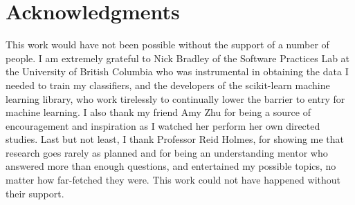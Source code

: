 \documentclass[sigchi]{acmart}
\begin{document}
\section{Acknowledgments}
This work would have not been possible without the support of a number of people. I am extremely grateful to Nick Bradley of the Software Practices Lab at the University of British Columbia who was instrumental in obtaining the data I needed to train my classifiers, and the developers of the scikit-learn machine learning library, who work tirelessly to continually lower the barrier to entry for machine learning. I also thank my friend Amy Zhu for being a source of encouragement and inspiration as I watched her perform her own directed studies. Last but not least, I thank Professor Reid Holmes, for showing me that research goes rarely as planned and for being an understanding mentor who answered more than enough questions, and entertained my possible topics, no matter how far-fetched they were. This work could not have happened without their support.




\end{document}
